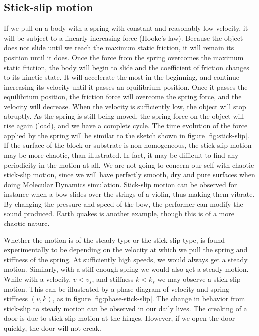 \documentclass[twoside,english]{uiofysmaster}
\begin{document}
\subsection{Stick-slip motion}
If we pull on a body with a spring with constant and reasonably low velocity, it will be subject to a linearly increasing force (Hooke's law). 
Because the object does not slide until we reach the maximum static friction, it will remain its position until it does.
Once the force from the spring overcomes the maximum static friction, the body will begin to slide and the coefficient of friction changes to its kinetic state.
It will accelerate the most in the beginning, and continue increasing its velocity until it passes an equilibrium position.
Once it passes the equilibrium position, the friction force will overcome the spring force, and the velocity will decrease. 
When the velocity is sufficiently low, the object will stop abruptly. 
As the spring is still being moved, the spring force on the object will rise again (load), and we have a complete cycle.
The time evolution of the force applied by the spring will be similar to the sketch shown in figure \ref{fig:stick-slip}.
If the surface of the block or substrate is non-homogeneous, the stick-slip motion may be more chaotic, than illustrated. 
In fact, it may be difficult to find any periodicity in the motion at all. 
We are not going to concern our self with chaotic stick-slip motion, since we will have perfectly smooth, dry and pure surfaces when doing Molecular Dynamics simulation.  
Stick-slip motion can be observed for instance when a bow slides over the strings of a violin, thus making them vibrate. 
By changing the pressure and speed of the bow, the performer can modify the sound produced. 
Earth quakes is another example, though this is of a more chaotic nature.

Whether the motion is of the steady type or the stick-slip type, is found experimentally to be depending on the velocity at which we pull the spring and  stiffness of the spring.
At sufficiently high speeds, we would always get a steady motion. 
Similarly, with a stiff enough spring we would also get a steady motion. 
While with a velocity, $v<v_s$, and stiffness $k<k_s$ we may observe a stick-slip motion.
This can be illustrated by a phase diagram of velocity and spring stiffness $(v,k)$, as in figure \ref{fig:phase-stick-slip}.
The change in behavior from stick-slip to steady motion can be observed in our daily lives. 
The creaking of a door is due to stick-slip motion at the hinges.
However, if we open the door quickly, the door will not creak.
\end{document}
